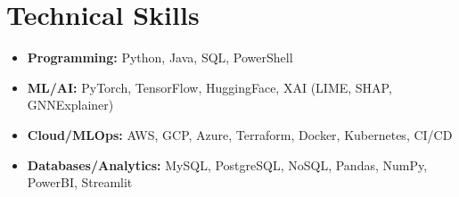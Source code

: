 \documentclass[letterpaper,11pt]{article}
\begin{document}
\vspace{-12pt}

\section{Technical Skills}
\begin{itemize}[leftmargin=0.15in, label={}, itemsep=-4pt]
    \item \textbf{Programming:} Python, Java, SQL, PowerShell  
    \item \textbf{ML/AI:} PyTorch, TensorFlow, HuggingFace, XAI (LIME, SHAP, GNNExplainer)  
    \item \textbf{Cloud/MLOps:} AWS, GCP, Azure, Terraform, Docker, Kubernetes, CI/CD  
    \item \textbf{Databases/Analytics:} MySQL, PostgreSQL, NoSQL, Pandas, NumPy, PowerBI, Streamlit
\end{itemize}
\end{document}
